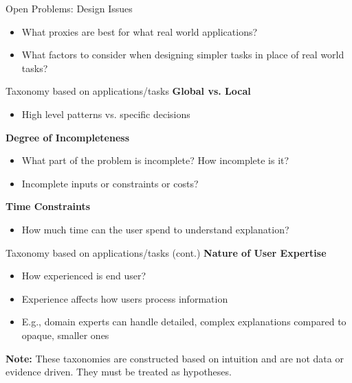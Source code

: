 \documentclass[10pt,aspectratio=169]{beamer}
\begin{document}
\begin{frame}{Open Problems: Design Issues}
\begin{itemize}
\item What proxies are best for what real world applications?
\item What factors to consider when designing simpler tasks in place of real world tasks?
\end{itemize}
\end{frame}

\begin{frame}{Taxonomy based on applications/tasks}
\textbf{Global vs. Local}
\begin{itemize}
\item High level patterns vs. specific decisions
\end{itemize}

\textbf{Degree of Incompleteness}
\begin{itemize}
\item What part of the problem is incomplete? How incomplete is it?
\item Incomplete inputs or constraints or costs?
\end{itemize}

\textbf{Time Constraints}
\begin{itemize}
\item How much time can the user spend to understand explanation?
\end{itemize}
\end{frame}

\begin{frame}{Taxonomy based on applications/tasks (cont.)}
\textbf{Nature of User Expertise}
\begin{itemize}
\item How experienced is end user?
\item Experience affects how users process information
\item E.g., domain experts can handle detailed, complex explanations compared to opaque, smaller ones
\end{itemize}

\vspace{0.5cm}
\textbf{Note:} These taxonomies are constructed based on intuition and are not data or evidence driven. They must be treated as hypotheses.
\end{frame}
\end{document}

